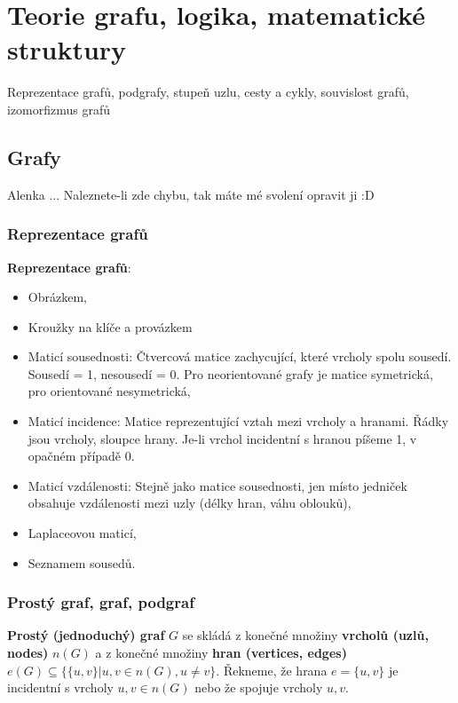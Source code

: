 
\chapter{Teorie grafu, logika, matematické struktury}
Reprezentace grafů, podgrafy, stupeň uzlu, cesty a cykly, souvislost grafů, izomorfizmus grafů\\
\section{Grafy}
Alenka ... Naleznete-li zde chybu, tak máte mé svolení opravit ji :D
\subsection{Reprezentace grafů}

\textbf{Reprezentace grafů}:
\begin{itemize}
    \item Obrázkem,
    \item Kroužky na klíče a provázkem
    \item Maticí sousednosti: Čtvercová matice zachycující, které vrcholy spolu sousedí. Sousedí = 1, nesousedí = 0. Pro neorientované grafy je matice symetrická, pro orientované nesymetrická,
    \item Maticí incidence: Matice reprezentující vztah mezi vrcholy a hranami. Řádky jsou vrcholy, sloupce hrany. Je-li vrchol incidentní s hranou píšeme 1, v opačném případě 0.
    \item Maticí vzdálenosti: Stejně jako matice sousednosti, jen místo jedniček obsahuje vzdálenosti mezi uzly (délky hran, váhu oblouků),
    \item Laplaceovou maticí,
    \item Seznamem sousedů.
\end{itemize}

\subsection{Prostý graf, graf, podgraf}

\begin{definition}
\textbf{Prostý (jednoduchý) graf} $G$ se skládá z konečné množiny \textbf{vrcholů (uzlů, nodes)} $n(G)$ a z konečné množiny \textbf{hran (vertices, edges)} $e(G)  \subseteq \{ \{ u, v \} | u,v \in n(G), u \neq v \}$. Řekneme, že hrana $e = \{ u, v \}$ je incidentní s vrcholy $u,v \in n(G)$ nebo že spojuje vrcholy $u,v$.
\end{definition}

